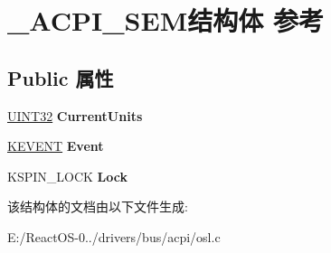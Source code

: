 \hypertarget{struct___a_c_p_i___s_e_m}{}\section{\+\_\+\+A\+C\+P\+I\+\_\+\+S\+E\+M结构体 参考}
\label{struct___a_c_p_i___s_e_m}
\subsection*{Public 属性}
\begin{DoxyCompactItemize}
\item 
\mbox{\label{struct___a_c_p_i___s_e_m_ad22615af2771e73c75706e747d524a56}} 
\hyperlink{_processor_bind_8h_ae1e6edbbc26d6fbc71a90190d0266018}{U\+I\+N\+T32} {\bfseries Current\+Units}
\item 
\mbox{\label{struct___a_c_p_i___s_e_m_a0f37942abc31773497ad81a3e307d01b}} 
\hyperlink{struct___k_e_v_e_n_t}{K\+E\+V\+E\+NT} {\bfseries Event}
\item 
\mbox{\label{struct___a_c_p_i___s_e_m_aed873f511d17e3fa792add7c5ef329e6}} 
K\+S\+P\+I\+N\+\_\+\+L\+O\+CK {\bfseries Lock}
\end{DoxyCompactItemize}


该结构体的文档由以下文件生成\+:\begin{DoxyCompactItemize}
\item 
E\+:/\+React\+O\+S-\/0../drivers/bus/acpi/osl.\+c\end{DoxyCompactItemize}
